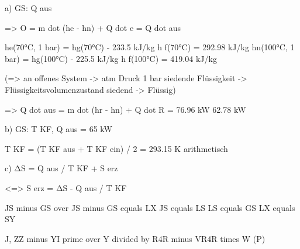 a) GS: Q aus

=> O = m dot (he - hn) + Q dot e = Q dot aus

he(70°C, 1 bar) = hg(70°C) - 233.5 kJ/kg h f(70°C) = 292.98 kJ/kg  
hn(100°C, 1 bar) = hg(100°C) - 225.5 kJ/kg h f(100°C) = 419.04 kJ/kg  

(=> an offenes System -> atm Druck 1 bar  
siedende Flüssigkeit -> Flüssigkeitsvolumenzustand  
siedend -> Flüssig)

=> Q dot aus = m dot (hr - hn) + Q dot R = 76.96 kW 62.78 kW

b) GS: T KF, Q aus = 65 kW

T KF = (T KF aus + T KF ein) / 2 = 293.15 K  
arithmetisch

c) ΔS = Q aus / T KF + S erz

<=> S erz = ΔS - Q aus / T KF

JS minus GS over JS minus GS equals LX  
JS equals LS  
LS equals GS  
LX equals SY  

J, ZZ minus YI prime over Y divided by R4R minus VR4R times W (P)